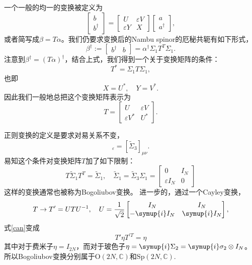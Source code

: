 一个一般的均一的变换被定义为
\begin{equation}
  \begin{bmatrix}
      b\\
      b^\dagger
  \end{bmatrix}=\begin{bmatrix}
      U & \varepsilon V\\
      \varepsilon Y & X
  \end{bmatrix}\begin{bmatrix}
      a\\
      a^\dagger
  \end{bmatrix},
\end{equation}
或者简写成$\beta=T\alpha$。我们仍要求变换后的Nambu spinor的厄秘共轭有如下形式，
\begin{equation}
  \beta^\dagger := \begin{bmatrix}
      b^\dagger & b
  \end{bmatrix} = \alpha^\dagger \Sigma_1 T^T \Sigma_1.
\end{equation}
注意到$\beta^\dagger = (T\alpha)^\dagger$，结合上式，我们得到一个关于变换矩阵的条件：
\begin{equation}
  T^*=\Sigma_1 T \Sigma_1,\label{her}
\end{equation}
也即
\begin{equation}
  X=U^*,\quad Y=V^*.
\end{equation}
因此我们一般地总把这个变换矩阵表示为
\begin{equation}
  \boxed{
  T=\begin{bmatrix}
      U & \varepsilon V\\
      \varepsilon V^* & U^*
  \end{bmatrix}.}
\end{equation}


正则变换的定义是要求对易关系不变，
\begin{equation}
  [\beta_\mu,\beta^\dagger_\nu]_\varepsilon = [\tilde \Sigma_3]_{\mu\nu}.
\end{equation}
易知这个条件对变换矩阵$T$加了如下限制：
\begin{equation}
  T\tilde \Sigma_1 T^T=\tilde \Sigma_1,\quad \tilde\Sigma_1=\tilde\Sigma_3\Sigma_1=\begin{bmatrix}
      0 & I_N\\
      \varepsilon I_N & 0
  \end{bmatrix}\label{can}
\end{equation}
这样的变换通常也被称为Bogoliubov变换。 进一步的，通过一个Cayley变换，
\begin{equation}
  T\rightarrow T'=UTU^{-1},\quad U=\frac{1}{\sqrt{2}}\begin{bmatrix}
      I_N & I_N\\
      -\symup{i} I_N & \symup{i} I_N
  \end{bmatrix},
\end{equation}
式\eqref{can}变成
\begin{equation}
  T' \eta T^{\prime T}=\eta
\end{equation}
其中对于费米子$\eta = I_{2N}$，而对于玻色子$\eta=\symup{i}\Sigma_2=\symup{i}\sigma_2\otimes I_N$。所以Bogoliubov变换分别属于$\mathrm{O}(2N,\mathbb C)$和$\mathrm{Sp}(2N,\mathbb C)$.

